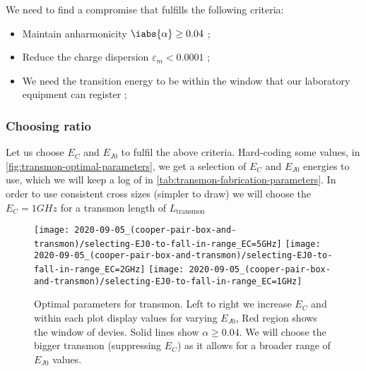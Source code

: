 \begin{framed}\noindent
  \noindent We need to find a compromise that fulfills the following criteria:

  \begin{itemize}
  \item Maintain anharmonicity $\iabs{\alpha} \ge 0.04 $ \hfill {};
  \item Reduce the charge dispersion $\varepsilon_m < 0.0001$ \hfill {};
  \item  We need  the transition  energy to  be within  the window  that our  laboratory equipment  can register  \hfill
    ;
  \end{itemize}
\end{framed}

\subsubsection{Choosing ratio}
Let   us   choose   $E_C$   and   $E_{J0}$   to    fulfil   the   above   criteria.    Hard-coding   some   values,   in
\autoref{fig:transmon-optimal-parameters}, we get a selection of $E_C$ and  $E_{J0}$ energies to use, which we will keep
a log of in \autoref{tab:transmon-fabrication-parameters}.  In order to  use consistent cross sizes (simpler to draw) we
will choose the $E_C=1GHz$ for a transmon length of $L_{\text{transmon}}$

\begin{figure}[h]
  \centering
  \texttt{[image: 2020-09-05\_(cooper-pair-box-and-transmon)/selecting-EJ0-to-fall-in-range\_EC=5GHz]}%
  \texttt{[image: 2020-09-05\_(cooper-pair-box-and-transmon)/selecting-EJ0-to-fall-in-range\_EC=2GHz]}%
  \texttt{[image: 2020-09-05\_(cooper-pair-box-and-transmon)/selecting-EJ0-to-fall-in-range\_EC=1GHz]}%
  \caption{\small Optimal parameters for transmon.  Left to right  we increase $E_C$ and within each plot display values
    for varying $E_{J0}$, Red region shows the window of devies.   Solid lines show $\alpha \ge 0.04$.  We will choose the
    bigger    transmon    (suppressing    $E_C$)    as    it    allows    for    a    broader    range    of    $E_{J0}$
    values.\label{fig:transmon-optimal-parameters}}
\end{figure}


